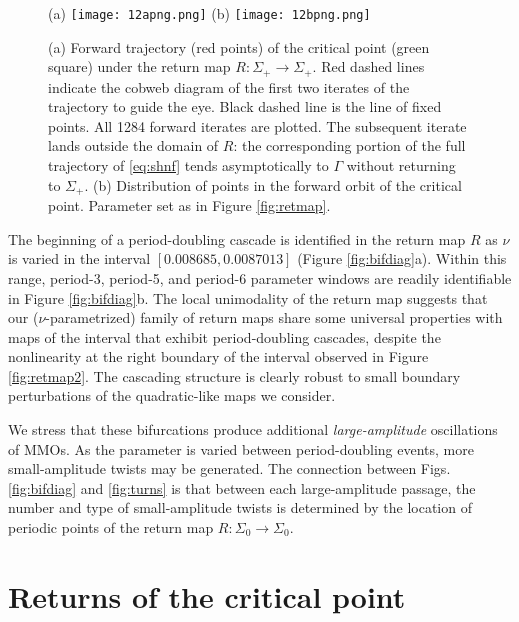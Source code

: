 \documentclass[aip, cha, sd, amsmath,amssymb, preprint]{revtex4-1}
\begin{document}
\begin{figure}[b]
(a) \texttt{[image: 12apng.png]}
(b) \texttt{[image: 12bpng.png]}
\caption{\label{fig:crit}  (a) Forward trajectory (red points) of the critical point (green square) under the return map $R: \Sigma_+ \to \Sigma_+$. Red dashed lines indicate the cobweb diagram of the first two iterates of the trajectory to guide the eye. Black dashed line is the line of fixed points. All 1284 forward iterates are plotted. The subsequent iterate lands outside the domain of $R$: the corresponding portion of the full trajectory of \eqref{eq:shnf}  tends asymptotically to $\Gamma$ without returning to $\Sigma_+$. (b) Distribution of points in the forward orbit of the critical point. Parameter set as in Figure \ref{fig:retmap}.}
\end{figure}

The beginning of a period-doubling cascade is identified in the return map $R$ as $\nu$ is varied in the interval $\left[ 0.008685, 0.0087013\right]$ (Figure \ref{fig:bifdiag}a). Within this range, period-3, period-5, and period-6 parameter windows are readily identifiable in Figure \ref{fig:bifdiag}b. The local unimodality of the return map suggests that our ($\nu$-parametrized) family of return maps share some universal properties with maps of the interval that exhibit period-doubling cascades,\cite{feigenbaum1978,coullet1978} despite the nonlinearity at the right boundary of the interval observed in Figure \ref{fig:retmap2}. The cascading structure is clearly robust to small boundary perturbations of the quadratic-like maps we consider. 

We stress that these bifurcations produce additional {\it large-amplitude} oscillations of MMOs. As the parameter is varied between period-doubling events, more small-amplitude twists may be generated. The connection between Figs. \ref{fig:bifdiag} and \ref{fig:turns} is that between each large-amplitude passage, the number and type of small-amplitude twists is determined by the location of periodic points of the return map $R:\Sigma_0\to\Sigma_0$. 

\section{\label{sec:ret} Returns of the critical point}
\end{document}
